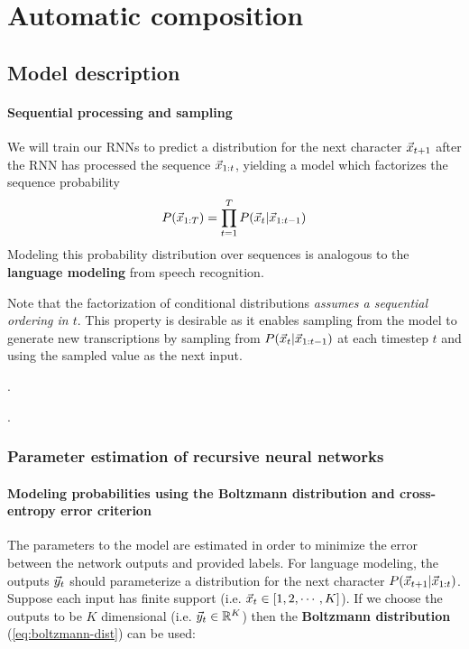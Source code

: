 \documentclass[dissertation.tex]{subfiles}
\begin{document}
\chapter{Automatic composition}

\section{Model description}

\subsubsection{Sequential processing and sampling}

We will train our RNNs to predict a distribution for the next character
$\vec{x}_{t+1}$ after the RNN has processed the sequence $\vec{x}_{1:t}$,
yielding a model which factorizes the sequence probability
\begin{equation}
    P(\vec{x}_{1:T}) = \prod_{t=1}^T P(\vec{x}_t | \vec{x}_{1:t-1} )
\end{equation}
Modeling this probability distribution over sequences is analogous to the
\textbf{language modeling} from speech recognition.

Note that the factorization of conditional distributions \emph{assumes a
sequential ordering in $t$}. This property is desirable as it enables sampling
from the model to generate new transcriptions by sampling from $P(\vec{x}_t |
\vec{x}_{1:t-1})$ at each timestep $t$ and using the sampled value as the next
input.

.

.

\subsection{Parameter estimation of recursive neural networks}

\subsubsection{Modeling probabilities using the Boltzmann distribution and cross-entropy error criterion}

The parameters to the model are estimated in order to minimize the error
between the network outputs and provided labels. For language modeling, the
outputs $\vec{y}_t$ should parameterize a distribution for the next character
$P(\vec{x}_{t+1} | \vec{x}_{1:t})$. Suppose each input has finite support (i.e.
$\vec{x}_t \in [1,2,\cdots,K]$). If we choose the outputs to be $K$ dimensional
(i.e. $\vec{y}_t \in \mathbb{R}^K$) then the \textbf{Boltzmann distribution}
(\autoref{eq:boltzmann-dist}) can be used:
\end{document}
